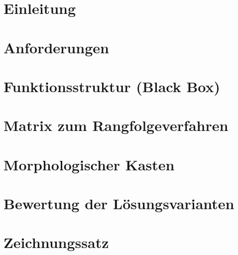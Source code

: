 \documentclass[a4paper,12pt]{article}
\begin{document}


\newpage

\tableofcontents
\vspace{1.5cm}

\newpage


\section{Einleitung}


\newpage

 \section{Anforderungen}
\label{Anforderungen}




\newpage

\section{Funktionsstruktur (Black Box)}
\label{Funktionsstruktur}


\newpage

\section{Matrix zum Rangfolgeverfahren}
\label{Rangfolgeverfahren}


\newpage




\newpage

\section{Morphologischer Kasten}
\label{Morphologischer Kasten}


\newpage

\section{Bewertung der Lösungsvarianten}
\label{Bewertung Lösungsvariante}


\newpage


\section{Zeichnungssatz}
\label{Zeichnungssatz}

\end{document}

